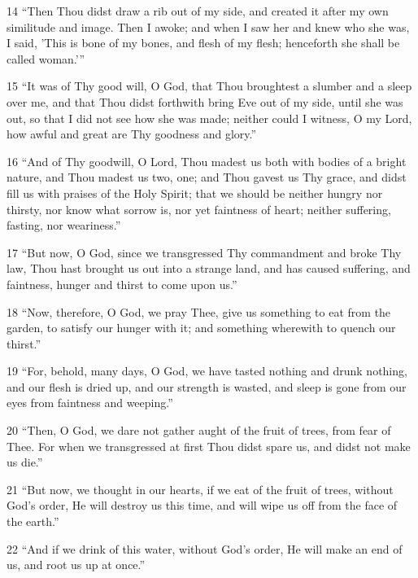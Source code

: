 \par 14 “Then Thou didst draw a rib out of my side, and created it after my own similitude and image. Then I awoke; and when I saw her and knew who she was, I said, 'This is bone of my bones, and flesh of my flesh; henceforth she shall be called woman.'”

\par 15 “It was of Thy good will, O God, that Thou broughtest a slumber and a sleep over me, and that Thou didst forthwith bring Eve out of my side, until she was out, so that I did not see how she was made; neither could I witness, O my Lord, how awful and great are Thy goodness and glory.”

\par 16 “And of Thy goodwill, O Lord, Thou madest us both with bodies of a bright nature, and Thou madest us two, one; and Thou gavest us Thy grace, and didst fill us with praises of the Holy Spirit; that we should be neither hungry nor thirsty, nor know what sorrow is, nor yet faintness of heart; neither suffering, fasting, nor weariness.”

\par 17 “But now, O God, since we transgressed Thy commandment and broke Thy law, Thou hast brought us out into a strange land, and has caused suffering, and faintness, hunger and thirst to come upon us.”

\par 18 “Now, therefore, O God, we pray Thee, give us something to eat from the garden, to satisfy our hunger with it; and something wherewith to quench our thirst.”

\par 19 “For, behold, many days, O God, we have tasted nothing and drunk nothing, and our flesh is dried up, and our strength is wasted, and sleep is gone from our eyes from faintness and weeping.”

\par 20 “Then, O God, we dare not gather aught of the fruit of trees, from fear of Thee. For when we transgressed at first Thou didst spare us, and didst not make us die.”

\par 21 “But now, we thought in our hearts, if we eat of the fruit of trees, without God's order, He will destroy us this time, and will wipe us off from the face of the earth.”

\par 22 “And if we drink of this water, without God's order, He will make an end of us, and root us up at once.”

